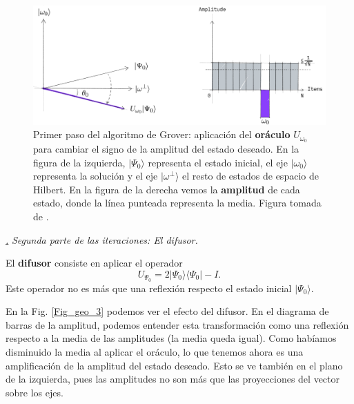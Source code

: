 \documentclass[a4paper,11pt]{book} %
\numberwithin{equation}{chapter}
\def\subsubiContadorIt{\par\addtocounter{subsubsection}{1}\underline{\it\thesubsubsection.}\hskip0.5cm \setcounter{subsubsubsectionIt}{0}}
\newcommand{\SubsubiIt}[1]{
		\subsubiContadorIt \textit{#1}
	}
\newcounter{subsubsubsectionIt}[subsubsection]
\begin{document}
	\begin{figure}[H]
	\centering 
	\includegraphics[width=0.85\linewidth]{Figuras/Fig_geo_2.png}
	\caption{Primer paso del algoritmo de Grover: aplicación del \textbf{oráculo} $U_{\omega_0}$ para cambiar el signo de la amplitud del estado deseado. En la figura de la izquierda, $| \Psi_0 \rangle$ representa el estado inicial, el eje $|\omega_0 \rangle $ representa la solución y el eje $| \omega^{\perp} \rangle$ el resto de estados de espacio de Hilbert. 	En la figura de la derecha vemos la \textbf{amplitud} de cada estado, donde la línea punteada representa la media. Figura tomada de \cite{bib_Qiskit-Grover}.}
	\label{Fig_geo_2}
	\end{figure}







\SubsubiIt{Segunda parte de las iteraciones: El difusor.}

El \textbf{difusor} consiste en aplicar el operador 
\begin{equation} \label{ec_geo_Us}
\boxed{U_{\Psi_0} = 2 |\Psi_0 \rangle \langle \Psi_0 | - I }.
\end{equation}
Este operador no es más que una reflexión respecto el estado inicial $|\Psi_0 \rangle$.


En la Fig. \ref{Fig_geo_3} podemos ver el efecto del difusor.  En el diagrama de barras de la amplitud, podemos entender esta transformación como una reflexión respecto a la media de las amplitudes (la media queda igual). Como habíamos disminuido la media al aplicar el oráculo, lo que tenemos ahora es una amplificación de la amplitud del estado deseado. Esto se ve también en el plano de la izquierda, pues las amplitudes no son más que las proyecciones del vector sobre los ejes. 
\end{document}
